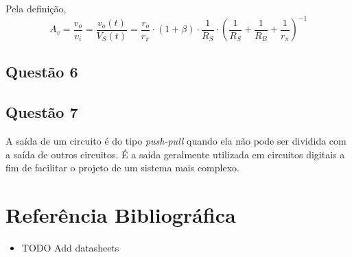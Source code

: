 \documentclass[12pt, a4paper, twoside]{article}
\begin{document}
Pela definição,
$$ A_v = \frac{v_o}{v_i} = \frac{v_o(t)}{V_S(t)} = \frac{r_o}{r_\pi} \cdot (1+\beta) \cdot \frac{1}{R_S} \cdot \left(\frac{1}{R_S} + \frac{1}{R_B} + \frac{1}{r_\pi} \right)^{-1} $$

\subsection{Questão 6}


\subsection{Questão 7}

A saída de um circuito é do tipo \textit{push-pull} quando ela não pode ser dividida com a saída de outros circuitos. É a saída geralmente utilizada em circuitos digitais a fim de facilitar o projeto de um sistema mais complexo.

\section{Referência Bibliográfica}

\begin{itemize}
    \item TODO Add datasheets
\end{itemize}
\end{document}
